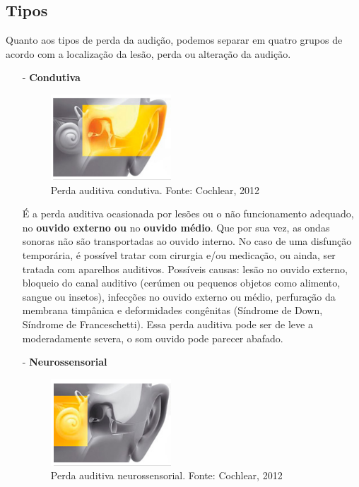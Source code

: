 \documentclass[brasil]{abnt}
\begin{document}
			\subsection{Tipos}
				Quanto aos tipos de perda da audição, podemos separar em quatro grupos de acordo com a localização da lesão, perda ou alteração da audição.
				 
				 \begin{itemize}		
					\item [-] \textbf{Condutiva} 
						\begin{figure}[!htb]
							\center
							\includegraphics[width=45mm]{pac.png}
							\caption{Perda auditiva condutiva. Fonte: Cochlear, 2012}
						\end{figure}
						
						É a perda auditiva ocasionada por lesões ou o não funcionamento adequado, no \textbf{ouvido externo ou} no \textbf{ouvido médio}. Que por sua vez, as ondas sonoras não são transportadas ao ouvido interno. 
						No caso de uma disfunção temporária, é possível tratar com cirurgia e/ou medicação, ou ainda, ser tratada com aparelhos auditivos. Possíveis causas: lesão no ouvido externo, bloqueio do canal 
						auditivo (cerúmen ou pequenos objetos como alimento, sangue ou insetos), infecções no ouvido externo ou médio, perfuração da membrana timpânica e deformidades congênitas (Síndrome de Down, 
						Síndrome de Franceschetti). Essa perda auditiva pode ser de leve a moderadamente severa, o som ouvido pode parecer abafado. 

					\item [-] \textbf{Neurossensorial} 
						\begin{figure}[!htb]
							\center
							\includegraphics[width=45mm]{pan.png}
							\caption{Perda auditiva neurossensorial. Fonte: Cochlear, 2012}
						\end{figure}
						

\end{itemize}
\end{document}
